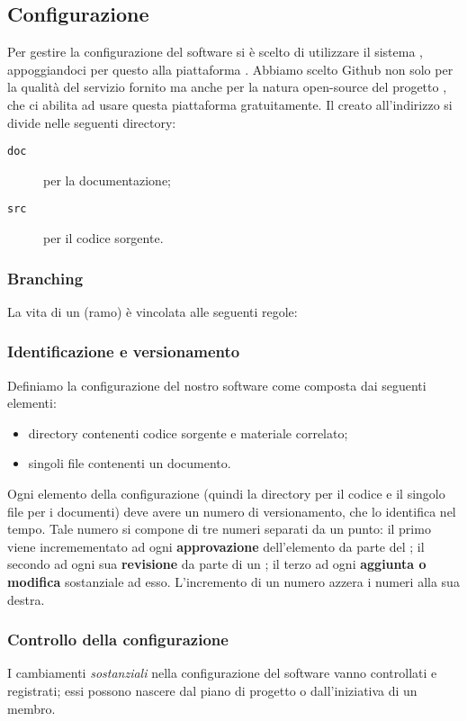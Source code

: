 \subsection{Configurazione} \label{sec:config}
Per gestire la configurazione del software si è scelto di utilizzare il sistema , appoggiandoci per questo alla piattaforma . Abbiamo scelto Github non solo per la qualità del servizio fornito ma anche per la natura open-source del progetto \proj, che ci abilita ad usare questa piattaforma gratuitamente. Il  creato all'indirizzo \repo{} si divide nelle seguenti directory:
\begin{description}
	\item[\texttt{doc}] per la documentazione;
	\item[\texttt{src}] per il codice sorgente.
\end{description}

\subsubsection{Branching} La vita di un  (ramo) è vincolata alle seguenti regole:
\subsubsection{Identificazione e versionamento} \label{sec:idvers}
Definiamo la configurazione del nostro software come composta dai seguenti elementi:
\begin{itemize}
	\item directory contenenti codice sorgente e materiale correlato;
	\item singoli file contenenti un documento.
\end{itemize}
Ogni elemento della configurazione (quindi la directory per il codice e il singolo file per i documenti) deve avere un numero di versionamento, che lo identifica nel tempo. Tale numero si compone di tre numeri separati da un punto: il primo viene incremementato ad ogni \textbf{approvazione} dell'elemento da parte del ; il secondo ad ogni sua \textbf{revisione} da parte di un ; il terzo ad ogni \textbf{aggiunta o modifica} sostanziale ad esso. L'incremento di un numero azzera i numeri alla sua destra.

\subsubsection{Controllo della configurazione} I cambiamenti \emph{sostanziali} nella configurazione del software vanno controllati e registrati; essi possono nascere dal piano di progetto o dall'iniziativa di un membro.
